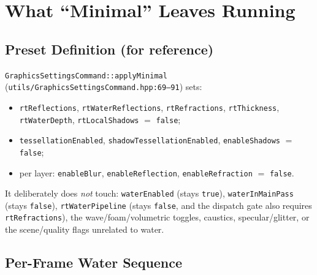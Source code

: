 \documentclass[11pt,a4paper]{article}
\begin{document}
\section{What ``Minimal'' Leaves Running}

\subsection{Preset Definition (for reference)}

\texttt{GraphicsSettingsCommand::applyMinimal} (\texttt{utils/GraphicsSettingsCommand.hpp:69--91}) sets:
\begin{itemize}
    \item \texttt{rtReflections}, \texttt{rtWaterReflections}, \texttt{rtRefractions}, \texttt{rtThickness}, \texttt{rtWaterDepth}, \texttt{rtLocalShadows} $=$ \texttt{false};
    \item \texttt{tessellationEnabled}, \texttt{shadowTessellationEnabled}, \texttt{enableShadows} $=$ \texttt{false};
    \item per layer: \texttt{enableBlur}, \texttt{enableReflection}, \texttt{enableRefraction} $=$ \texttt{false}.
\end{itemize}
It deliberately does \emph{not} touch: \texttt{waterEnabled} (stays \texttt{true}), \texttt{waterInMainPass} (stays \texttt{false}), \texttt{rtWaterPipeline} (stays \texttt{false}, and the
dispatch gate also requires \texttt{rtRefractions}), the wave/foam/volumetric toggles, caustics, specular/glitter, or the scene/quality flags unrelated to water.

\subsection{Per-Frame Water Sequence}
\end{document}
